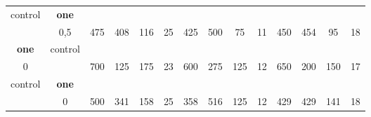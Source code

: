 \begin{table}[]
{\begin{tabular}{|c|c|c|c|c|c|c|c|c|c|c|c|c|c|}
control & \cellcolor{blue!15}\textbf{one}& {\color[HTML]{00009B} } & {\color[HTML]{9A0000} } & {\color[HTML]{009901} } &  & {\color[HTML]{00009B} } & {\color[HTML]{9A0000} } & {\color[HTML]{009901} } &  & {\color[HTML]{00009B} } & {\color[HTML]{9A0000} } & {\color[HTML]{009901} } &  \\ 
 & \cellcolor{ blue!15}0,5 & \multirow{-2}{*}{{\color[HTML]{00009B} 475}} & \multirow{-2}{*}{{\color[HTML]{9A0000} 408}} & \multirow{-2}{*}{{\color[HTML]{009901} 116}} & \multirow{-2}{*}{25} & \multirow{-2}{*}{{\color[HTML]{00009B} 425}} & \multirow{-2}{*}{{\color[HTML]{9A0000} 500}} & \multirow{-2}{*}{{\color[HTML]{009901} 75}} & \multirow{-2}{*}{11} & \multirow{-2}{*}{{\color[HTML]{00009B} 450}} & \multirow{-2}{*}{{\color[HTML]{9A0000} 454}} & \multirow{-2}{*}{{\color[HTML]{009901} 95}} & \multirow{-2}{*}{18} \\ \hline

\cellcolor{blue!15}\textbf{one} & control& {\color[HTML]{00009B} } & {\color[HTML]{9A0000} } & {\color[HTML]{009901} } &  & {\color[HTML]{00009B} } & {\color[HTML]{9A0000} } & {\color[HTML]{009901} } &  & {\color[HTML]{00009B} } & {\color[HTML]{9A0000} } & {\color[HTML]{009901} } &  \\ 
\cellcolor{ blue!15}0 &  & \multirow{-2}{*}{{\color[HTML]{00009B} 700}} & \multirow{-2}{*}{{\color[HTML]{9A0000} 125}} & \multirow{-2}{*}{{\color[HTML]{009901} 175}} & \multirow{-2}{*}{23} & \multirow{-2}{*}{{\color[HTML]{00009B} 600}} & \multirow{-2}{*}{{\color[HTML]{9A0000} 275}} & \multirow{-2}{*}{{\color[HTML]{009901} 125}} & \multirow{-2}{*}{12} & \multirow{-2}{*}{{\color[HTML]{00009B} 650}} & \multirow{-2}{*}{{\color[HTML]{9A0000} 200}} & \multirow{-2}{*}{{\color[HTML]{009901} 150}} & \multirow{-2}{*}{17} \\ \hline

control & \cellcolor{blue!15}\textbf{one}& {\color[HTML]{00009B} } & {\color[HTML]{9A0000} } & {\color[HTML]{009901} } &  & {\color[HTML]{00009B} } & {\color[HTML]{9A0000} } & {\color[HTML]{009901} } &  & {\color[HTML]{00009B} } & {\color[HTML]{9A0000} } & {\color[HTML]{009901} } &  \\ 
 & \cellcolor{ blue!15}0 & \multirow{-2}{*}{{\color[HTML]{00009B} 500}} & \multirow{-2}{*}{{\color[HTML]{9A0000} 341}} & \multirow{-2}{*}{{\color[HTML]{009901} 158}} & \multirow{-2}{*}{25} & \multirow{-2}{*}{{\color[HTML]{00009B} 358}} & \multirow{-2}{*}{{\color[HTML]{9A0000} 516}} & \multirow{-2}{*}{{\color[HTML]{009901} 125}} & \multirow{-2}{*}{12} & \multirow{-2}{*}{{\color[HTML]{00009B} 429}} & \multirow{-2}{*}{{\color[HTML]{9A0000} 429}} & \multirow{-2}{*}{{\color[HTML]{009901} 141}} & \multirow{-2}{*}{18} \\ \hline


\end{tabular}}
\end{table}
